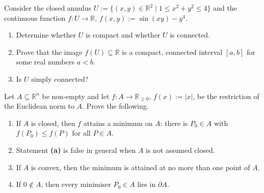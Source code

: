 \begin{exercise}
\label{ex:annulus_continuous_image}
Consider the closed annulus $U := \{(x,y) \in \mathbb{R}^2 \mid 1 \leq x^2+y^2 \leq 4\}$ and the continuous function $f : U \to \mathbb{R}$, $f(x,y) := \sin(xy) - y^4$.
\begin{enumerate}[label=\textbf{(\alph*)}]
  \item Determine whether $U$ is compact and whether $U$ is connected.
  \item Prove that the image $f(U) \subseteq \mathbb{R}$ is a compact, connected interval $[a,b]$ for some real numbers $a < b$.
  \item Is $U$ simply connected?
\end{enumerate}
\end{exercise}

\begin{exercise}
\label{ex:nearest_point_to_origin}
Let $A \subseteq \mathbb{R}^n$ be non-empty and let $f : A \to \mathbb{R}_{\ge 0}$, $f(x) :=
\lvert x\rvert$, be the restriction of the Euclidean norm to $A$. Prove the following.
\begin{enumerate}[label=\textbf{(\alph*)}]
  \item If $A$ is closed, then $f$ attains a minimum on $A$: there is $P_0 \in A$ with
    $f(P_0) \le f(P)$ for all $P \in A$.
  \item Statement \textbf{(a)} is false in general when $A$ is not assumed closed.
  \item If $A$ is convex, then the minimum is attained at no more than one point of $A$.
  \item If $0 \notin A$, then every minimiser $P_0 \in A$ lies in $\partial A$.
\end{enumerate}
\end{exercise}

